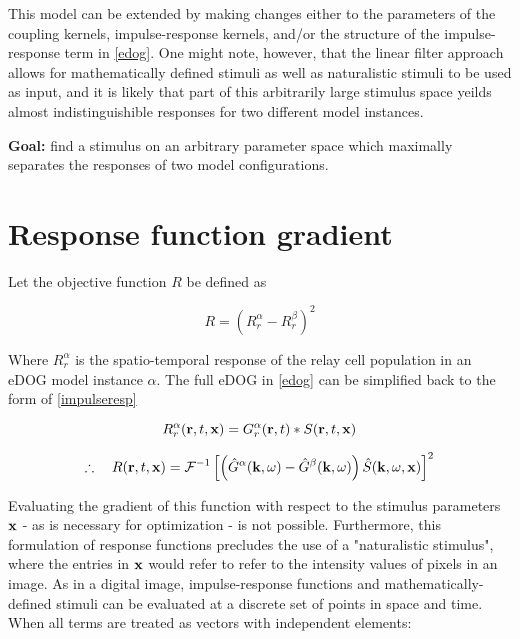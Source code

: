 \documentclass{article}
\newcommand{\vect}[1]{\textbf{\textrm{#1}}}
\begin{document}
This model can be extended by making changes either to the parameters of the coupling kernels, impulse-response kernels, and/or the structure of the impulse-response term in \eqref{edog}. 
One might note, however, that the linear filter approach allows for mathematically defined stimuli as well as naturalistic stimuli to be used as input, and it is likely that part of this arbitrarily large stimulus space yeilds almost indistinguishible responses for two different model instances.

\begin{center}
\begin{minipage}{0.8\textwidth}
	\textbf{Goal:} find a stimulus on an arbitrary parameter space which maximally separates 	
	the responses of two model configurations.
\end{minipage}
\end{center}


\section{Response function gradient} \label{responsegradient}
Let the objective function $R$ be defined as

\begin{equation}
	R = (R_{r}^{\alpha} - R_{r}^{\beta})^2
\end{equation}

Where $R_{r}^{\alpha}$ is the spatio-temporal response of the relay cell population in an eDOG model instance $\alpha$. 
The full eDOG in \eqref{edog} can be simplified back to the form of \eqref{impulseresp}

\begin{equation*}
	R_{r}^{\alpha}(\vect{r},t,\vect{x}) = G_{r}^{\alpha}(\vect{r},t)*S(\vect{r},t,\vect{x}) 
\end{equation*}

\begin{equation} \label{objfunc}
	\therefore \quad R(\vect{r}, t, \vect{x}) = \mathcal{F}^{-1} \left[ 
	\left(\hat{G}^{\alpha}(\vect{k}, \omega) - \hat{G}^{\beta}(\vect{k}, \omega)\right)
	\hat{S}(\vect{k}, \omega, \vect{x}) \right]^2 
\end{equation}

Evaluating the gradient of this function with respect to the stimulus parameters $\vect{x}$ - as is necessary for optimization - is not possible.
Furthermore, this formulation of response functions precludes the use of a "naturalistic stimulus", where the entries in $\vect{x}$ would refer to refer to the intensity values of pixels in an image.
As in a digital image, impulse-response functions and mathematically-defined stimuli can be evaluated at a discrete set of points in space and time.
When all terms are treated as vectors with independent elements:
\end{document}
